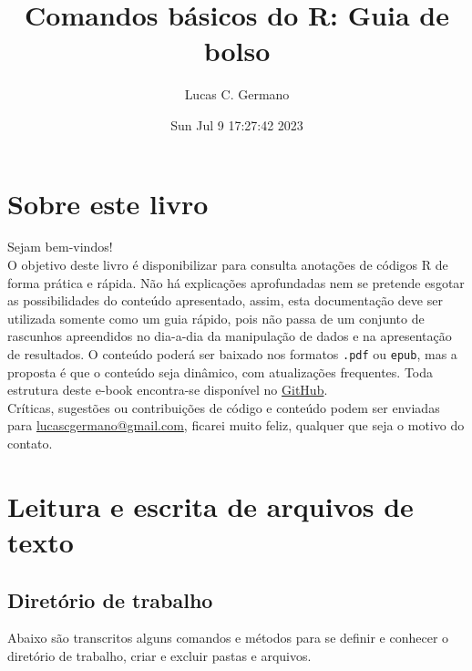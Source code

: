 \documentclass[
]{book}
\title{Comandos básicos do R: Guia de bolso}
\author{Lucas C. Germano}
\date{Sun Jul 9 17:27:42 2023}
\theoremstyle{definition}
\theoremstyle{definition}
\theoremstyle{definition}
\theoremstyle{definition}
\theoremstyle{remark}
\begin{document}
\maketitle

{
\setcounter{tocdepth}{1}
\tableofcontents
}
\hypertarget{sobre-este-livro}{%
\chapter*{Sobre este livro}\label{sobre-este-livro}}

Sejam bem-vindos!\\
O objetivo deste livro é disponibilizar para consulta anotações de códigos R de forma prática e rápida. Não há explicações aprofundadas nem se pretende esgotar as possibilidades do conteúdo apresentado, assim, esta documentação deve ser utilizada somente como um guia rápido, pois não passa de um conjunto de rascunhos apreendidos no dia-a-dia da manipulação de dados e na apresentação de resultados. O conteúdo poderá ser baixado nos formatos \texttt{.pdf} ou \texttt{epub}, mas a proposta é que o conteúdo seja dinâmico, com atualizações frequentes. Toda estrutura deste e-book encontra-se disponível no \href{https://github.com/lucascgmermano/guia_de_bolso.git}{GitHub}.\\
Críticas, sugestões ou contribuições de código e conteúdo podem ser enviadas para \url{lucascgermano@gmail.com}, ficarei muito feliz, qualquer que seja o motivo do contato.

\hypertarget{leitura-e-escrita-de-arquivos-de-texto}{%
\chapter{Leitura e escrita de arquivos de texto}\label{leitura-e-escrita-de-arquivos-de-texto}}

\hypertarget{diretuxf3rio-de-trabalho}{%
\section{Diretório de trabalho}\label{diretuxf3rio-de-trabalho}}

Abaixo são transcritos alguns comandos e métodos para se definir e conhecer o diretório de trabalho, criar e excluir pastas e arquivos.
\end{document}
